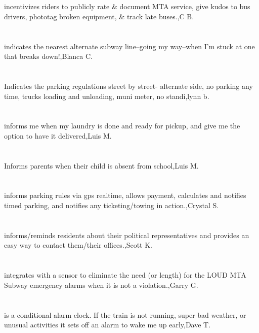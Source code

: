 \section{}incentivizes riders to publicly rate \& document MTA service, give kudos to bus drivers, phototag broken equipment, \& track late buses.,C B.	
\section{}indicates the nearest alternate subway line--going my way--when I'm stuck at one that breaks down!,Blanca C.	
\section{}Indicates the parking regulations street by street- alternate side, no parking any time, trucks loading and unloading, muni meter, no standi,lynn b.	
\section{}informs me when my laundry is done and ready for pickup, and give me the option to have it delivered,Luis M.	
\section{}Informs parents when their child is absent from school,Luis M.	
\section{}informs parking rules via gps realtime, allows payment, calculates and notifies timed parking, and notifies any ticketing/towing in action.,Crystal  S.	
\section{}informs/reminds residents about their political representatives and provides an easy way to contact them/their offices.,Scott K.	
\section{}integrates with a sensor to eliminate the need (or length) for the LOUD MTA Subway emergency alarms when it is not a violation.,Garry G.	
\section{}is a conditional alarm clock. If the train is not running, super bad weather, or unusual activities it sets off an alarm to wake me up early,Dave T.	

